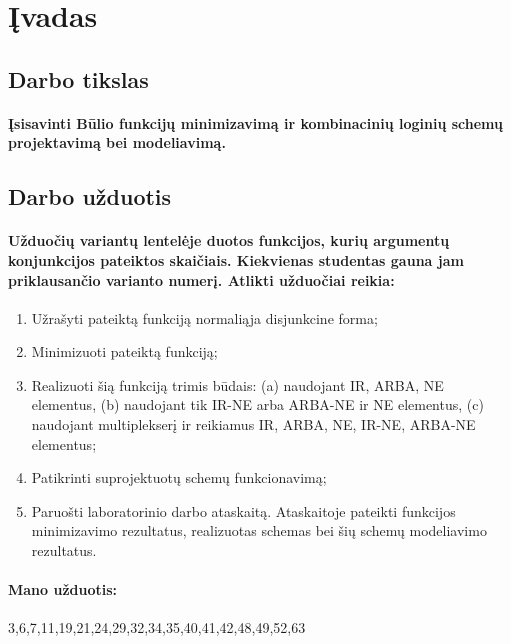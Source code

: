 \documentclass[12pt]{article}
\begin{document}
		

\tableofcontents

\newpage


\section{Įvadas}

\subsection{Darbo tikslas}


\paragraph{Įsisavinti Būlio funkcijų minimizavimą ir kombinacinių loginių schemų projektavimą bei modeliavimą.}

\subsection{Darbo užduotis}

\paragraph{Užduočių variantų lentelėje duotos funkcijos, kurių argumentų konjunkcijos pateiktos skaičiais. Kiekvienas studentas gauna jam priklausančio varianto numerį. Atlikti užduočiai reikia:}	
\begin{enumerate}
	\item  Užrašyti pateiktą funkciją normaliąja disjunkcine forma;
	\item Minimizuoti pateiktą funkciją;
	\item  Realizuoti šią funkciją trimis būdais: (a) naudojant IR, ARBA, NE elementus, (b) naudojant tik IR-NE arba ARBA-NE ir NE elementus, (c) naudojant multiplekserį ir reikiamus IR, ARBA, NE, IR-NE, ARBA-NE elementus;
	\item Patikrinti suprojektuotų schemų funkcionavimą;
	\item  Paruošti laboratorinio darbo ataskaitą. Ataskaitoje pateikti funkcijos minimizavimo rezultatus, realizuotas schemas bei šių schemų modeliavimo rezultatus.
\end{enumerate}

\paragraph{Mano užduotis:}
3,6,7,11,19,21,24,29,32,34,35,40,41,42,48,49,52,63 
\end{document}
